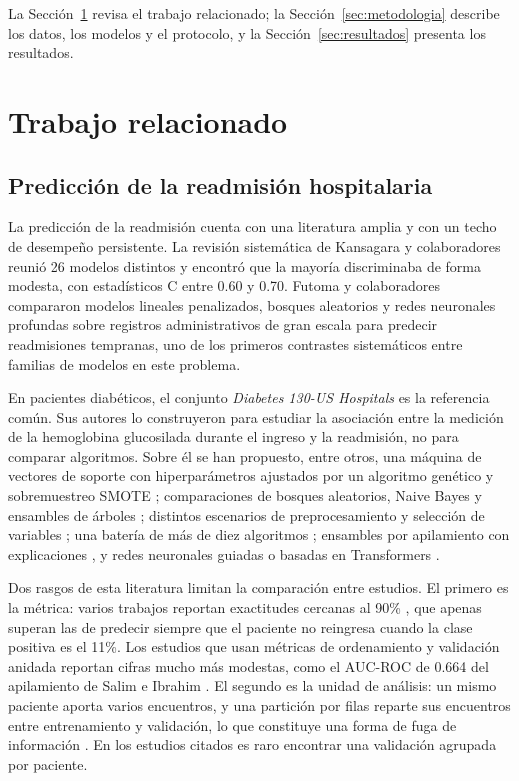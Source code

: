 \documentclass[pdflatex,sn-mathphys-num]{sn-jnl}
\theoremstyle{plain}
\begin{document}
La Sección~\ref{sec:relacionado} revisa el trabajo relacionado; la Sección~\ref{sec:metodologia} describe los datos, los modelos y el protocolo, y la Sección~\ref{sec:resultados} presenta los resultados.

\section{Trabajo relacionado}\label{sec:relacionado}

\subsection{Predicción de la readmisión hospitalaria}\label{subsec:rel_readmision}

La predicción de la readmisión cuenta con una literatura amplia y con un techo de desempeño persistente. La revisión sistemática de Kansagara y colaboradores \cite{bib_kansagara} reunió 26 modelos distintos y encontró que la mayoría discriminaba de forma modesta, con estadísticos C entre 0.60 y 0.70. Futoma y colaboradores \cite{bib_futoma} compararon modelos lineales penalizados, bosques aleatorios y redes neuronales profundas sobre registros administrativos de gran escala para predecir readmisiones tempranas, uno de los primeros contrastes sistemáticos entre familias de modelos en este problema.

En pacientes diabéticos, el conjunto \emph{Diabetes 130-US Hospitals} \cite{bib_strack} es la referencia común. Sus autores lo construyeron para estudiar la asociación entre la medición de la hemoglobina glucosilada durante el ingreso y la readmisión, no para comparar algoritmos. Sobre él se han propuesto, entre otros, una máquina de vectores de soporte con hiperparámetros ajustados por un algoritmo genético y sobremuestreo SMOTE \cite{bib_cui_2018}; comparaciones de bosques aleatorios, Naive Bayes y ensambles de árboles \cite{bib_shang_2021}; distintos escenarios de preprocesamiento y selección de variables \cite{bib_neto_2021}; una batería de más de diez algoritmos \cite{bib_liu_2024}; ensambles por apilamiento con explicaciones \cite{bib_lu_2022, bib_salim_2026}, y redes neuronales guiadas o basadas en Transformers \cite{bib_ram_2023, bib_garcia_mosquera_2025}.

Dos rasgos de esta literatura limitan la comparación entre estudios. El primero es la métrica: varios trabajos reportan exactitudes cercanas al 90\% \cite{bib_neto_2021}, que apenas superan las de predecir siempre que el paciente no reingresa cuando la clase positiva es el 11\%. Los estudios que usan métricas de ordenamiento y validación anidada reportan cifras mucho más modestas, como el AUC-ROC de 0.664 del apilamiento de Salim e Ibrahim \cite{bib_salim_2026}. El segundo es la unidad de análisis: un mismo paciente aporta varios encuentros, y una partición por filas reparte sus encuentros entre entrenamiento y validación, lo que constituye una forma de fuga de información \cite{bib_kapoor_2023}. En los estudios citados es raro encontrar una validación agrupada por paciente.
\end{document}

